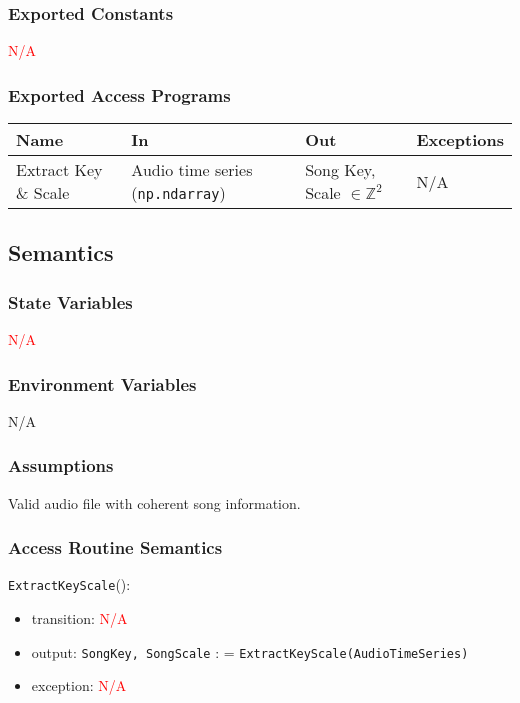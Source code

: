\documentclass[12pt, titlepage]{article}
\begin{document}
\subsubsection{Exported Constants}
\textcolor{red}{N/A}

\subsubsection{Exported Access Programs}

\begin{center}
\begin{tabular}{p{2cm} p{4cm} p{4cm} p{2cm}}
\hline
\textbf{Name} & \textbf{In} & \textbf{Out} & \textbf{Exceptions}\\
\hline%
Extract Key \& Scale &Audio time series (\texttt{np.ndarray}) & Song Key, Scale $\in \mathbb{Z}^2$ & N/A \\
\hline
\end{tabular}
\end{center}

\subsection{Semantics}

\subsubsection{State Variables}
\textcolor{red}{N/A}

\subsubsection{Environment Variables}
N/A

\subsubsection{Assumptions}
Valid audio file with coherent song information.

\subsubsection{Access Routine Semantics}

\noindent \texttt{Extract\textunderscore Key\textunderscore Scale}():
\begin{itemize}
\item transition: \textcolor{red}{N/A}
\item output: \texttt{SongKey, SongScale} : = \texttt{Extract\textunderscore Key\textunderscore Scale(Audio\textunderscore Time\textunderscore Series)}
\item exception: \textcolor{red}{N/A}
\end{itemize}
\end{document}
